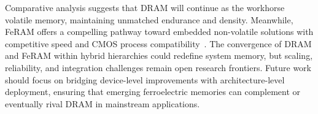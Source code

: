 Comparative analysis suggests that DRAM will continue as the workhorse volatile memory, maintaining unmatched endurance and density. 
Meanwhile, FeRAM offers a compelling pathway toward embedded non-volatile solutions with competitive speed and CMOS process compatibility~\cite{noheda2023, martin2020}. 
The convergence of DRAM and FeRAM within hybrid hierarchies could redefine system memory, but scaling, reliability, and integration challenges remain open research frontiers. 
Future work should focus on bridging device-level improvements with architecture-level deployment, ensuring that emerging ferroelectric memories can complement or eventually rival DRAM in mainstream applications.
